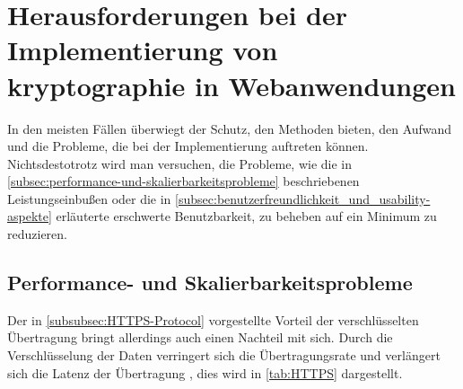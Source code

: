 \newpage
\section[Herausforderungen bei der Implementierung von Kryptographie in Webanwendungen]{Herausforderungen bei der Implementierung von \gls{kryptographie} in Webanwendungen}\label{sec:Herausforderung-bei-der-implementierung-von-kryptographie-in-webanwendungen}
In den meisten Fällen überwiegt der Schutz, den  Methoden bieten, den Aufwand und die Probleme, die bei der Implementierung auftreten können. Nichtsdestotrotz wird man versuchen, die Probleme, wie \zb die in \autoref{subsec:performance-und-skalierbarkeitsprobleme} beschriebenen Leistungseinbußen oder die in \autoref{subsec:benutzerfreundlichkeit_und_usability-aspekte} erläuterte erschwerte Benutzbarkeit, zu beheben \bzw auf ein Minimum zu reduzieren.

\subsection{Performance- und Skalierbarkeitsprobleme}\label{subsec:performance-und-skalierbarkeitsprobleme}
Der in \autoref{subsubsec:HTTPS-Protocol} vorgestellte Vorteil der verschlüsselten Übertragung bringt allerdings auch einen Nachteil mit sich. Durch die Verschlüsselung der Daten verringert sich die Übertragungsrate und verlängert sich die Latenz der Übertragung \autocite[]{goldberg_comparison_nodate}, dies wird in \autoref{tab:HTTPS} \autocite[Übersetzt nach:][]{goldberg_comparison_nodate} dargestellt.


